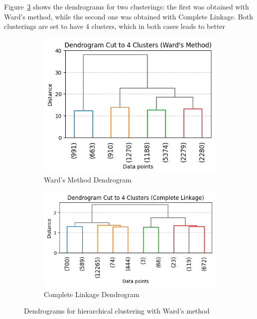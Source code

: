 Figure~\ref{fig:dendrograms_ward} shows the dendrograms for two clusterings: the first was
obtained with Ward's method, while the second one was obtained with Complete Linkage.
Both clusterings are set to have 4 clusters, which in both cases leads to better 
\begin{figure}[H]
    \centering
    \begin{subfigure}[b]{0.49\textwidth}
        \centering
        \includegraphics[width=\textwidth]{plots/dendrogram_4.png}
        \caption{Ward's Method Dendrogram}
        \label{fig:pairplot_ward}
    \end{subfigure}
    \begin{subfigure}[b]{0.49\textwidth}
        \centering
        \includegraphics[width=\textwidth]{plots/dendrogram_complete.png}
        \caption{Complete Linkage Dendrogram}
        \label{fig:pairplot_ward_5}
    \end{subfigure}
    \caption{Dendrograms for hierarchical clustering with Ward's method}
    \label{fig:dendrograms_ward}
\end{figure}

